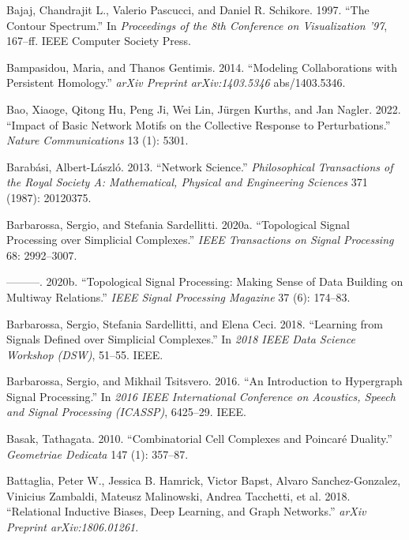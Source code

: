 \documentclass[
  12pt,
]{krantz}
\newlength{\cslhangindent}
\newenvironment{CSLReferences}[2] %
 {\begin{list}{}{%
  \setlength{\itemindent}{0pt}
  \setlength{\leftmargin}{0pt}
  \setlength{\parsep}{0pt}
  \ifodd #1
   \setlength{\leftmargin}{\cslhangindent}
   \setlength{\itemindent}{-1\cslhangindent}
  \fi
  \setlength{\itemsep}{#2\baselineskip}}}
 {\end{list}}
\begin{document}
\begin{CSLReferences}{1}{0}
Bajaj, Chandrajit L., Valerio Pascucci, and Daniel R. Schikore. 1997.
{``The Contour Spectrum.''} In \emph{{Proceedings of the 8th Conference
on Visualization '97}}, 167--ff. IEEE Computer Society Press.

Bampasidou, Maria, and Thanos Gentimis. 2014. {``Modeling Collaborations
with Persistent Homology.''} \emph{arXiv Preprint arXiv:1403.5346}
abs/1403.5346.

Bao, Xiaoge, Qitong Hu, Peng Ji, Wei Lin, Jürgen Kurths, and Jan Nagler.
2022. {``Impact of Basic Network Motifs on the Collective Response to
Perturbations.''} \emph{Nature Communications} 13 (1): 5301.

Barabási, Albert-László. 2013. {``Network Science.''}
\emph{Philosophical Transactions of the Royal Society A: Mathematical,
Physical and Engineering Sciences} 371 (1987): 20120375.

Barbarossa, Sergio, and Stefania Sardellitti. 2020a. {``Topological
Signal Processing over Simplicial Complexes.''} \emph{IEEE Transactions
on Signal Processing} 68: 2992--3007.

---------. 2020b. {``Topological Signal Processing: Making Sense of Data
Building on Multiway Relations.''} \emph{IEEE Signal Processing
Magazine} 37 (6): 174--83.

Barbarossa, Sergio, Stefania Sardellitti, and Elena Ceci. 2018.
{``Learning from Signals Defined over Simplicial Complexes.''} In
\emph{2018 IEEE Data Science Workshop (DSW)}, 51--55. IEEE.

Barbarossa, Sergio, and Mikhail Tsitsvero. 2016. {``An Introduction to
Hypergraph Signal Processing.''} In \emph{2016 IEEE International
Conference on Acoustics, Speech and Signal Processing (ICASSP)},
6425--29. IEEE.

Basak, Tathagata. 2010. {``Combinatorial Cell Complexes and Poincar{é}
Duality.''} \emph{Geometriae Dedicata} 147 (1): 357--87.

Battaglia, Peter W., Jessica B. Hamrick, Victor Bapst, Alvaro
Sanchez-Gonzalez, Vinicius Zambaldi, Mateusz Malinowski, Andrea
Tacchetti, et al. 2018. {``Relational Inductive Biases, Deep Learning,
and Graph Networks.''} \emph{arXiv Preprint arXiv:1806.01261}.


\end{CSLReferences}
\end{document}
